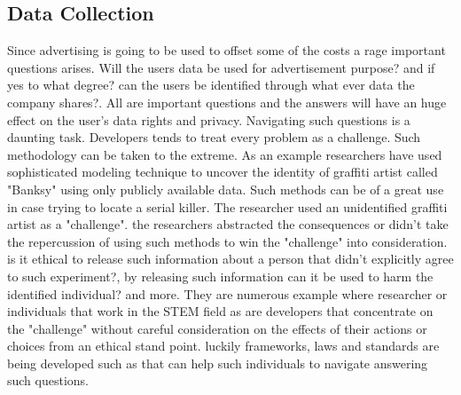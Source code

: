 \documentclass{article}
\begin{document}
\subsection{Data Collection}
Since advertising is going to be used to offset some of the costs a rage important questions arises. Will the users data be used for advertisement purpose? and if yes to what degree? can the users  be identified through what ever data the company shares?. All are important questions and the answers will have an huge effect on the user's data rights and privacy. Navigating such questions is a daunting task. Developers tends to treat every problem as a challenge. Such methodology can be taken to the extreme. As an example researchers have used sophisticated modeling technique to uncover the identity of graffiti artist called "Banksy" using only publicly available data\cite{Hauge2016}. Such methods can be of a great use in case trying to locate a serial killer. The researcher used an unidentified graffiti artist as a "challenge". the researchers abstracted the consequences or didn't take the repercussion of using such methods to win the "challenge" into consideration. is it ethical to release such information about a person that didn't explicitly agree to such experiment?, by releasing such information can it be used to harm the identified individual? and more. They are numerous example where researcher or individuals that work in the STEM field as are developers that concentrate on the "challenge" without careful consideration on the effects of their actions or choices from an ethical stand point. luckily frameworks, laws and standards are being developed such as \cite{Zook2017} that can help such individuals to navigate answering such questions.     

 

\end{document}
